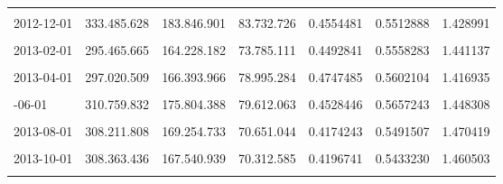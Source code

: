 \documentclass[12pt]{article}
\begin{document}
\begin{longtable}[t]{llllrrr}
\cellcolor{gray!10}{2012-11-01} & \cellcolor{gray!10}{296.879.634} & \cellcolor{gray!10}{163.382.994} & \cellcolor{gray!10}{75.527.971} & \cellcolor{gray!10}{0.4622756} & \cellcolor{gray!10}{0.5503341} & \cellcolor{gray!10}{1.420309}\\
2012-12-01 & 333.485.628 & 183.846.901 & 83.732.726 & 0.4554481 & 0.5512888 & 1.428991\\
\addlinespace
\cellcolor{gray!10}{2013-01-01} & \cellcolor{gray!10}{295.955.770} & \cellcolor{gray!10}{162.718.149} & \cellcolor{gray!10}{83.226.287} & \cellcolor{gray!10}{0.5114751} & \cellcolor{gray!10}{0.5498056} & \cellcolor{gray!10}{1.367229}\\
2013-02-01 & 295.465.665 & 164.228.182 & 73.785.111 & 0.4492841 & 0.5558283 & 1.441137\\
\cellcolor{gray!10}{2013-03-01} & \cellcolor{gray!10}{302.533.983} & \cellcolor{gray!10}{169.180.350} & \cellcolor{gray!10}{74.363.852} & \cellcolor{gray!10}{0.4395537} & \cellcolor{gray!10}{0.5592111} & \cellcolor{gray!10}{1.456469}\\
2013-04-01 & 297.020.509 & 166.393.966 & 78.995.284 & 0.4747485 & 0.5602104 & 1.416935\\
\cellcolor{gray!10}{2013-05-01} & \cellcolor{gray!10}{302.852.163} & \cellcolor{gray!10}{169.194.913} & \cellcolor{gray!10}{67.389.080} & \cellcolor{gray!10}{0.3982926} & \cellcolor{gray!10}{0.5586716} & \cellcolor{gray!10}{1.506380}\\
\addlinespace
2013-06-01 & 310.759.832 & 175.804.388 & 79.612.063 & 0.4528446 & 0.5657243 & 1.448308\\
\cellcolor{gray!10}{2013-07-01} & \cellcolor{gray!10}{304.941.433} & \cellcolor{gray!10}{169.590.819} & \cellcolor{gray!10}{75.120.855} & \cellcolor{gray!10}{0.4429535} & \cellcolor{gray!10}{0.5561423} & \cellcolor{gray!10}{1.448849}\\
2013-08-01 & 308.211.808 & 169.254.733 & 70.651.044 & 0.4174243 & 0.5491507 & 1.470419\\
\cellcolor{gray!10}{2013-09-01} & \cellcolor{gray!10}{311.800.042} & \cellcolor{gray!10}{171.086.110} & \cellcolor{gray!10}{88.860.911} & \cellcolor{gray!10}{0.5193929} & \cellcolor{gray!10}{0.5487046} & \cellcolor{gray!10}{1.358163}\\
2013-10-01 & 308.363.436 & 167.540.939 & 70.312.585 & 0.4196741 & 0.5433230 & 1.460503\\
\addlinespace
\cellcolor{gray!10}{2013-11-01} & \cellcolor{gray!10}{325.398.936} & \cellcolor{gray!10}{177.403.957} & \cellcolor{gray!10}{67.551.824} & \cellcolor{gray!10}{0.3807797} & \cellcolor{gray!10}{0.5451891} & \cellcolor{gray!10}{1.509644}\\

\end{longtable}
\end{document}
